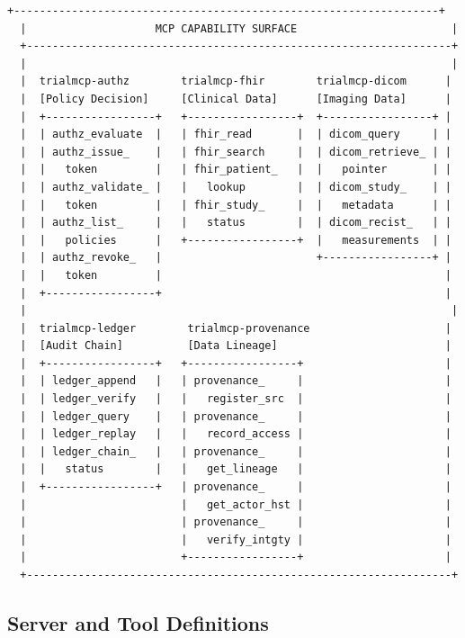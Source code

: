 \documentclass[10pt,letterpaper]{article}
\begin{document}
\begin{lstlisting}[title={\textbf{Capability Model: 5 Servers, 23 Tools}}]
  +------------------------------------------------------------------+
  |                    MCP CAPABILITY SURFACE                        |
  +------------------------------------------------------------------+
  |                                                                  |
  |  trialmcp-authz        trialmcp-fhir        trialmcp-dicom      |
  |  [Policy Decision]     [Clinical Data]      [Imaging Data]      |
  |  +-----------------+   +-----------------+  +-----------------+ |
  |  | authz_evaluate  |   | fhir_read       |  | dicom_query     | |
  |  | authz_issue_    |   | fhir_search     |  | dicom_retrieve_ | |
  |  |   token         |   | fhir_patient_   |  |   pointer       | |
  |  | authz_validate_ |   |   lookup        |  | dicom_study_    | |
  |  |   token         |   | fhir_study_     |  |   metadata      | |
  |  | authz_list_     |   |   status        |  | dicom_recist_   | |
  |  |   policies      |   +-----------------+  |   measurements  | |
  |  | authz_revoke_   |                        +-----------------+ |
  |  |   token         |                                            |
  |  +-----------------+                                            |
  |                                                                  |
  |  trialmcp-ledger        trialmcp-provenance                     |
  |  [Audit Chain]          [Data Lineage]                          |
  |  +-----------------+   +-----------------+                      |
  |  | ledger_append   |   | provenance_     |                      |
  |  | ledger_verify   |   |   register_src  |                      |
  |  | ledger_query    |   | provenance_     |                      |
  |  | ledger_replay   |   |   record_access |                      |
  |  | ledger_chain_   |   | provenance_     |                      |
  |  |   status        |   |   get_lineage   |                      |
  |  +-----------------+   | provenance_     |                      |
  |                        |   get_actor_hst |                      |
  |                        | provenance_     |                      |
  |                        |   verify_intgty |                      |
  |                        +-----------------+                      |
  +------------------------------------------------------------------+
\end{lstlisting}

\subsection{Server and Tool Definitions}
\end{document}
